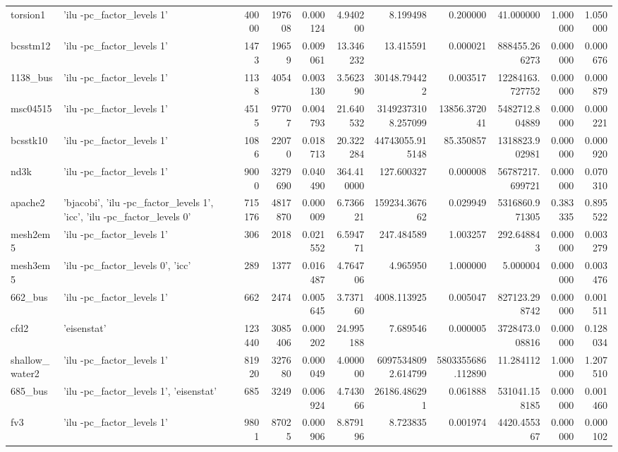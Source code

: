 \begin{tabular}{llrrrrrrrrr}
torsion1 & {'ilu -pc\_factor\_levels 1'} & 40000 & 197608 & 0.000124 & 4.940200 & 8.199498 & 0.200000 & 41.000000 & 1.000000 & 1.050000 \\
bcsstm12 & {'ilu -pc\_factor\_levels 1'} & 1473 & 19659 & 0.009061 & 13.346232 & 13.415591 & 0.000021 & 888455.266273 & 0.000000 & 0.000676 \\
1138\_bus & {'ilu -pc\_factor\_levels 1'} & 1138 & 4054 & 0.003130 & 3.562390 & 30148.794422 & 0.003517 & 12284163.727752 & 0.000000 & 0.000879 \\
msc04515 & {'ilu -pc\_factor\_levels 1'} & 4515 & 97707 & 0.004793 & 21.640532 & 31492373108.257099 & 13856.372041 & 5482712.804889 & 0.000000 & 0.000221 \\
bcsstk10 & {'ilu -pc\_factor\_levels 1'} & 1086 & 22070 & 0.018713 & 20.322284 & 44743055.915148 & 85.350857 & 1318823.902981 & 0.000000 & 0.000920 \\
nd3k & {'ilu -pc\_factor\_levels 1'} & 9000 & 3279690 & 0.040490 & 364.410000 & 127.600327 & 0.000008 & 56787217.699721 & 0.000000 & 0.070310 \\
apache2 & {'bjacobi', 'ilu -pc\_factor\_levels 1', 'icc', 'ilu -pc\_factor\_levels 0'} & 715176 & 4817870 & 0.000009 & 6.736621 & 159234.367662 & 0.029949 & 5316860.971305 & 0.383335 & 0.895522 \\
mesh2em5 & {'ilu -pc\_factor\_levels 1'} & 306 & 2018 & 0.021552 & 6.594771 & 247.484589 & 1.003257 & 292.648843 & 0.000000 & 0.003279 \\
mesh3em5 & {'ilu -pc\_factor\_levels 0', 'icc'} & 289 & 1377 & 0.016487 & 4.764706 & 4.965950 & 1.000000 & 5.000004 & 0.000000 & 0.003476 \\
662\_bus & {'ilu -pc\_factor\_levels 1'} & 662 & 2474 & 0.005645 & 3.737160 & 4008.113925 & 0.005047 & 827123.298742 & 0.000000 & 0.001511 \\
cfd2 & {'eisenstat'} & 123440 & 3085406 & 0.000202 & 24.995188 & 7.689546 & 0.000005 & 3728473.008816 & 0.000000 & 0.128034 \\
shallow\_water2 & {'ilu -pc\_factor\_levels 1'} & 81920 & 327680 & 0.000049 & 4.000000 & 60975348092.614799 & 5803355686.112890 & 11.284112 & 1.000000 & 1.207510 \\
685\_bus & {'ilu -pc\_factor\_levels 1', 'eisenstat'} & 685 & 3249 & 0.006924 & 4.743066 & 26186.486291 & 0.061888 & 531041.158185 & 0.000000 & 0.001460 \\
fv3 & {'ilu -pc\_factor\_levels 1'} & 9801 & 87025 & 0.000906 & 8.879196 & 8.723835 & 0.001974 & 4420.455367 & 0.000000 & 0.000102 \\

\end{tabular}
